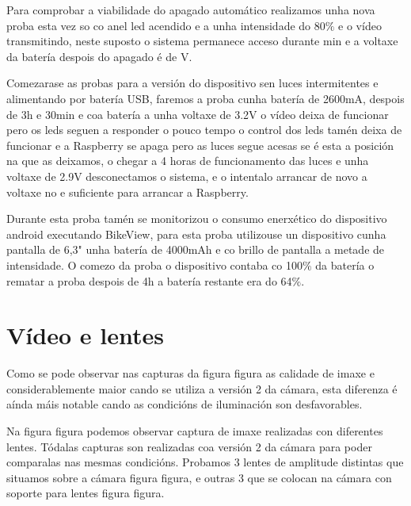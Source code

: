 Para comprobar a viabilidade do apagado automático realizamos unha nova proba esta vez so co anel led acendido e a unha intensidade do 80\(\%\) e o vídeo transmitindo, neste suposto o sistema permanece acceso durante  min e a voltaxe da batería despois do apagado é de V.

Comezarase as probas para a versión do dispositivo sen luces intermitentes e alimentando por batería USB, faremos a proba cunha batería de  2600mA, despois de 3h e 30min e coa batería a unha voltaxe de 3.2V o vídeo deixa de funcionar pero os leds seguen a responder o pouco tempo o control dos leds tamén deixa de funcionar e a Raspberry se apaga pero as luces segue acesas se é esta a posición na que as deixamos,  o chegar a 4 horas de funcionamento das luces e unha voltaxe de 2.9V desconectamos o sistema, e o intentalo arrancar de novo a voltaxe no e suficiente para arrancar a Raspberry.

Durante esta proba tamén se monitorizou o consumo enerxético do dispositivo android executando BikeView, para esta proba utilizouse un dispositivo cunha pantalla de 6,3" unha batería de 4000mAh e co brillo de pantalla a metade de intensidade. O comezo da proba o dispositivo contaba co 100\(\%\) da batería o rematar a proba despois de 4h a batería restante era do 64\(\%\).

\section{Vídeo e lentes}
Como se pode observar nas capturas da figura figura as calidade de imaxe e considerablemente maior cando se utiliza a versión 2 da cámara, esta diferenza é aínda máis notable cando as condicións de iluminación son desfavorables.

Na figura figura podemos observar captura de imaxe realizadas con diferentes lentes. Tódalas capturas son realizadas coa versión 2 da cámara para poder comparalas nas mesmas condicións. Probamos 3 lentes de amplitude distintas que situamos sobre a cámara figura figura, e outras 3 que se colocan na cámara con soporte para lentes figura figura.

